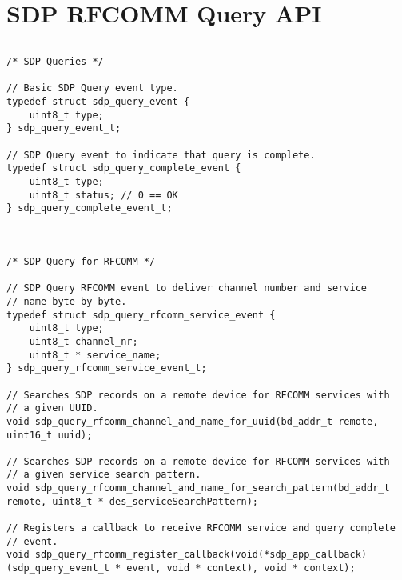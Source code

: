 \section{SDP RFCOMM Query API}
\label{appendix:api_sdp_query}
$ $
 \begin{lstlisting}
/* SDP Queries */

// Basic SDP Query event type.
typedef struct sdp_query_event {
    uint8_t type;
} sdp_query_event_t;

// SDP Query event to indicate that query is complete.
typedef struct sdp_query_complete_event {
    uint8_t type;
    uint8_t status; // 0 == OK
} sdp_query_complete_event_t;



/* SDP Query for RFCOMM */

// SDP Query RFCOMM event to deliver channel number and service 
// name byte by byte.
typedef struct sdp_query_rfcomm_service_event {
    uint8_t type;
    uint8_t channel_nr;
    uint8_t * service_name;
} sdp_query_rfcomm_service_event_t;

// Searches SDP records on a remote device for RFCOMM services with
// a given UUID.
void sdp_query_rfcomm_channel_and_name_for_uuid(bd_addr_t remote, uint16_t uuid);

// Searches SDP records on a remote device for RFCOMM services with 
// a given service search pattern.
void sdp_query_rfcomm_channel_and_name_for_search_pattern(bd_addr_t remote, uint8_t * des_serviceSearchPattern);

// Registers a callback to receive RFCOMM service and query complete
// event. 
void sdp_query_rfcomm_register_callback(void(*sdp_app_callback)(sdp_query_event_t * event, void * context), void * context);
\end{lstlisting}
\pagebreak